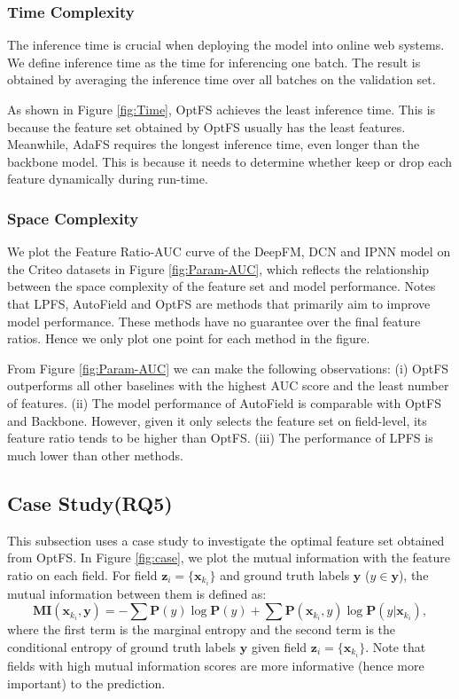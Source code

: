 \documentclass[sigconf]{acmart}
\begin{document}
\subsubsection{Time Complexity}
The inference time is crucial when deploying the model into online web systems. We define inference time as the time for inferencing one batch. The result is obtained by averaging the inference time over all batches on the validation set.

As shown in Figure \ref{fig:Time}, OptFS achieves the least inference time. This is because the feature set obtained by OptFS usually has the least features. Meanwhile, AdaFS requires the longest inference time, even longer than the backbone model. This is because it needs to determine whether keep or drop each feature dynamically during run-time.


\subsubsection{Space Complexity}
We plot the Feature Ratio-AUC curve of the DeepFM, DCN and IPNN model on the Criteo datasets in Figure \ref{fig:Param-AUC}, which reflects the relationship between the space complexity of the feature set and model performance. Notes that LPFS, AutoField and OptFS are methods that primarily aim to improve model performance. These methods have no guarantee over the final feature ratios. Hence we only plot one point for each method in the figure.

From Figure \ref{fig:Param-AUC} we can make the following observations: (i) OptFS outperforms all other baselines with the highest AUC score and the least number of features. (ii) The model performance of AutoField is comparable with OptFS and Backbone. However, given it only selects the feature set on field-level, its feature ratio tends to be higher than OptFS. (iii) The performance of LPFS is much lower than other methods.


\subsection{Case Study(RQ5)}

This subsection uses a case study to investigate the optimal feature set obtained from OptFS. In Figure \ref{fig:case}, we plot the mutual information with the feature ratio on each field. For field $\mathbf{z}_i = \{\mathbf{x}_{k_i}\}$ and ground truth labels $\mathbf{y}$ ($y \in \mathbf{y}$), the mutual information between them is defined as:
\begin{equation}
    \mathbf{MI}(\mathbf{x}_{k_i},\mathbf{y}) = -\sum \mathbf{P}(y) \log \mathbf{P}(y) + \sum \mathbf{P}(\mathbf{x}_{k_i} ,y) \log \mathbf{P}(y|\mathbf{x}_{k_i}),
\end{equation}
where the first term is the marginal entropy and the second term is the conditional entropy of ground truth labels $\mathbf{y}$ given field $\mathbf{z}_i = \{\mathbf{x}_{k_i}\}$. Note that fields with high mutual information scores are more informative (hence more important) to the prediction. 
\end{document}
